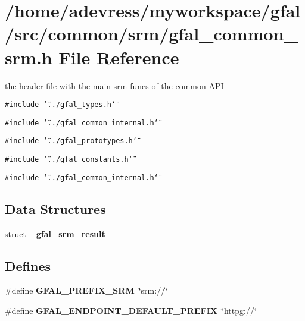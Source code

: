 \section{/home/adevress/myworkspace/gfal/src/common/srm/gfal\_\-common\_\-srm.h File Reference}
\label{gfal__common__srm_8h}
the header file with the main srm funcs of the common API 

{\tt \#include \char`\"{}../gfal\_\-types.h\char`\"{}}\par
{\tt \#include \char`\"{}../gfal\_\-common\_\-internal.h\char`\"{}}\par
{\tt \#include \char`\"{}../gfal\_\-prototypes.h\char`\"{}}\par
{\tt \#include \char`\"{}../gfal\_\-constants.h\char`\"{}}\par
{\tt \#include \char`\"{}../gfal\_\-common\_\-internal.h\char`\"{}}\par
\subsection*{Data Structures}
\begin{CompactItemize}
\item 
struct \textbf{\_\-gfal\_\-srm\_\-result}
\end{CompactItemize}
\subsection*{Defines}
\begin{CompactItemize}
\item 
\#define \textbf{GFAL\_\-PREFIX\_\-SRM}~\char`\"{}srm://\char`\"{}\label{gfal__common__srm_8h_c163cc407dc64638a5f13fe1d7ceb858}

\item 
\#define \textbf{GFAL\_\-ENDPOINT\_\-DEFAULT\_\-PREFIX}~\char`\"{}httpg://\char`\"{}\label{gfal__common__srm_8h_496c8a18054866dcb27ae3f3397ac303}

\end{CompactItemize}
